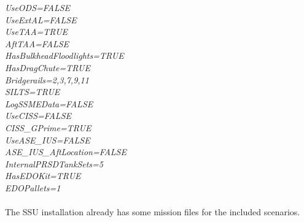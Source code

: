 \documentclass[Space_Shuttle_Ultra_Manual.tex]{subfiles}
\begin{document}
\begin{multicols*}{2}
\textit{UseODS=FALSE}
\\
\textit{UseExtAL=FALSE}
\\
\textit{UseTAA=TRUE}
\\
\textit{AftTAA=FALSE}
\\
\textit{HasBulkheadFloodlights=TRUE}
\\
\textit{HasDragChute=TRUE}
\\
\textit{Bridgerails=2,3,7,9,11}
\\
\textit{SILTS=TRUE}
\\
\textit{LogSSMEData=FALSE}
\\
\textit{UseCISS=FALSE}
\\
\textit{CISS\_GPrime=TRUE}
\\
\textit{UseASE\_IUS=FALSE}
\\
\textit{ASE\_IUS\_AftLocation=FALSE}
\\
\textit{InternalPRSDTankSets=5}
\\
\textit{HasEDOKit=TRUE}
\\
\textit{EDOPallets=1}
\\
\\
The SSU installation already has some mission files for the included scenarios.

\end{multicols*}

\newpage
\end{document}
